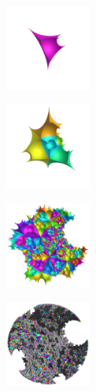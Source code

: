 \documentclass[dvipdfmx]{interact}
\theoremstyle{plain}%
\theoremstyle{definition}
\theoremstyle{remark}
\theoremstyle{problemstyle}
\begin{document}
\begin{figure}[H]
 \begin{minipage}[t]{0.19\textwidth}
  \centering
  \includegraphics[width=1.1in, height=1.1in, keepaspectratio]{./img/constructFractal/finiteProcess/step1.png}
  \label{fig:sphaira-step1}
 \end{minipage}
 \hspace*{\fill}
 \begin{minipage}[t]{0.19\textwidth}
  \centering
  \includegraphics[width=1.1in, height=1.1in, keepaspectratio]{./img/constructFractal/finiteProcess/step2.png}
  \label{fig:sphaira-step2}
 \end{minipage}
 \hspace*{\fill}
 \begin{minipage}[t]{0.19\textwidth}
  \centering
  \includegraphics[width=1.1in, height=1.1in, keepaspectratio]{./img/constructFractal/finiteProcess/step5.png}
  \label{fig:sphaira-step5}
 \end{minipage}
 \hspace*{\fill}
 \begin{minipage}[t]{0.19\textwidth}
  \centering
  \includegraphics[width=1.1in, height=1.1in, keepaspectratio]{./img/constructFractal/finiteProcess/step10.png}

\end{minipage}
\end{figure}
\end{document}
